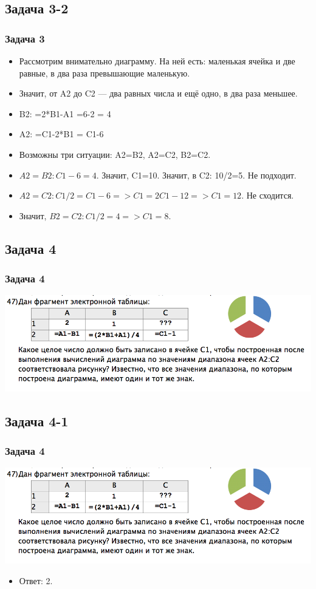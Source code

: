 \documentclass[compress,red]{beamer}
\begin{document}
\subsection{Задача 3-2}
\begin{frame}[fragile]
  \frametitle{Задача 3}
  \begin{itemize}[<+->]
    \item Рассмотрим внимательно диаграмму. На ней есть: маленькая ячейка и две равные, в два раза превышающие маленькую. 
    \item Значит, от A2 до C2 --- два равных числа и ещё одно, в два раза меньшее.
    \item B2: =2*B1-A1 =6-2 = 4
    \item A2: =C1-2*B1 = C1-6
    \item Возможны три ситуации: A2=B2, A2=C2, B2=C2.
    \item $A2=B2: C1-6=4$. Значит, C1=10. Значит, в C2: 10/2=5. Не подходит.
    \item $A2=C2: C1/2=C1-6 => C1=2C1-12 => C1=12$. Не сходится.
    \item Значит, $B2=C2: C1/2=4 => C1=8$. 
  \end{itemize}
\end{frame}

\subsection{Задача 4}
\begin{frame}[fragile]
  \frametitle{Задача 4}
  \centerline{\includegraphics[width=1.0\textwidth]{images/10.png}}
\end{frame}

\subsection{Задача 4-1}
\begin{frame}[fragile]
  \frametitle{Задача 4}
  \centerline{\includegraphics[width=1.0\textwidth]{images/10.png}}
  \begin{itemize}
      \item Ответ: 2.
  \end{itemize}
\end{frame}
\end{document}
